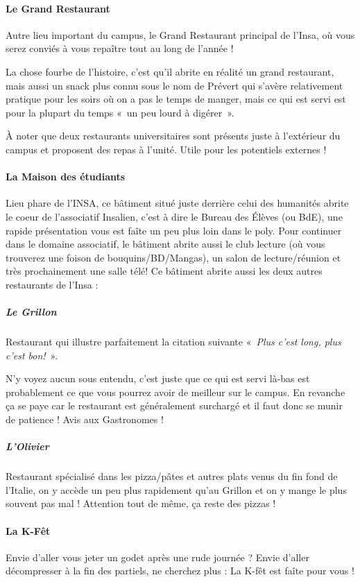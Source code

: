 \paragraph{Le Grand Restaurant}
Autre lieu important du campus, le Grand Restaurant principal de l'Insa, où vous
serez conviés à vous repaître tout au long de l'année ! 

La chose fourbe de l'histoire, c'est qu'il abrite en réalité un grand
restaurant, mais aussi un snack plus connu sous le nom de Prévert qui s'avère
relativement pratique pour les soirs où on a pas le temps de manger, mais ce
qui est servi est pour la plupart du temps «~un peu lourd à digérer~».  

À noter que deux restaurants universitaires sont présents juste à l'extérieur du campus et proposent des repas à l'unité. Utile pour les potentiels externes !

\paragraph{La Maison des étudiants}
Lieu phare de l'INSA, ce bâtiment situé juste derrière celui des humanités
abrite le coeur de l'associatif Insalien, c'est à dire le Bureau des Élèves (ou
BdE), une rapide présentation vous est faîte un peu plus loin dans le
poly. Pour continuer dans le domaine associatif, le bâtiment abrite aussi le
club lecture (où vous trouverez une foison de bouquins/BD/Mangas), un salon de
lecture/réunion et très prochainement une salle télé!
Ce bâtiment abrite aussi les deux autres restaurants de l'Insa :
\subparagraph{Le Grillon}
Restaurant qui illustre parfaitement la citation suivante «~\emph{Plus c'est long,
	   plus c'est bon!}~».

N'y voyez aucun sous entendu, c'est juste que ce qui est servi là-bas est probablement
ce que vous pourrez avoir de meilleur sur le campus. En revanche ça se paye car le restaurant 
est généralement surchargé et il faut donc se munir de patience ! Avis aux Gastronomes ! 
\subparagraph{L'Olivier}
Restaurant  spécialisé dans les pizza/pâtes et autres plats venus du fin
fond de l'Italie, on y accède un peu plus rapidement qu'au Grillon et on y
mange le plus souvent pas mal ! Attention tout de même, ça reste des
pizzas ! 

\paragraph{La K-Fêt}
Envie d'aller vous jeter un godet après une rude journée ? Envie d'aller
décompresser à la fin des partiels, ne cherchez plus : La K-fêt est faîte
pour vous !

